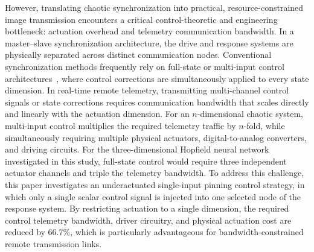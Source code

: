 \documentclass[a4paper,fleqn]{cas-sc}
\theoremstyle{plain}
\theoremstyle{definition}
\begin{document}
However, translating chaotic synchronization into practical, resource-constrained image transmission encounters a critical control-theoretic and engineering bottleneck: actuation overhead and telemetry communication bandwidth. In a master--slave synchronization architecture, the drive and response systems are physically separated across distinct communication nodes. Conventional synchronization methods frequently rely on full-state or multi-input control architectures~\cite{yassen2005controlling,feki2009sliding,su2021fixed}, where control corrections are simultaneously applied to every state dimension. In real-time remote telemetry, transmitting multi-channel control signals or state corrections requires communication bandwidth that scales directly and linearly with the actuation dimension. For an $n$-dimensional chaotic system, multi-input control multiplies the required telemetry traffic by $n$-fold, while simultaneously requiring multiple physical actuators, digital-to-analog converters, and driving circuits. For the three-dimensional Hopfield neural network investigated in this study, full-state control would require three independent actuator channels and triple the telemetry bandwidth. To address this challenge, this paper investigates an underactuated single-input pinning control strategy, in which only a single scalar control signal is injected into one selected node of the response system. By restricting actuation to a single dimension, the required control telemetry bandwidth, driver circuitry, and physical actuation cost are reduced by 66.7\%, which is particularly advantageous for bandwidth-constrained remote transmission links.
\end{document}
